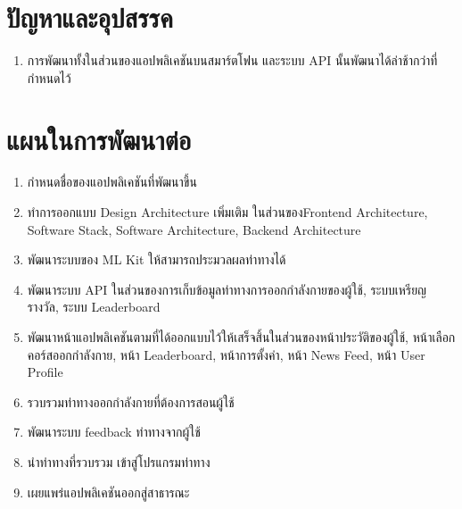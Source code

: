 \section{ปัญหาและอุปสรรค}
\begin{enumerate}
    \item การพัฒนาทั้งในส่วนของแอปพลิเคชันบนสมาร์ตโฟน และระบบ API นั้นพัฒนาได้ล่าช้ากว่าที่กำหนดไว้
\end{enumerate}

\section{แผนในการพัฒนาต่อ}
\begin{enumerate}
    \item กำหนดชื่อของแอปพลิเคชันที่พัฒนาขึ้น
    \item ทำการออกแบบ Design Architecture เพิ่มเติม ในส่วนของFrontend Architecture, Software Stack, Software Architecture, Backend Architecture
    \item พัฒนาระบบของ ML Kit ให้สามารถประมวลผลท่าทางได้
    \item พัฒนาระบบ API ในส่วนของการเก็บข้อมูลท่าทางการออกกำลังกายของผู้ใช้, ระบบเหรียญรางวัล, ระบบ Leaderboard
    \item พัฒนาหน้าแอปพลิเคชันตามที่ได้ออกแบบไว้ให้เสร็จสิ้นในส่วนของหน้าประวัติของผู้ใช้, หน้าเลือกคอร์สออกกำลังกาย, หน้า Leaderboard, หน้าการตั้งค่า, หน้า News Feed, หน้า User Profile
    \item รวบรวมท่าทางออกกำลังกายที่ต้องการสอนผู้ใช้
    \item พัฒนาระบบ feedback ท่าทางจากผู้ใช้
    \item นำท่าทางที่รวบรวม เข้าสู่โปรแกรมท่าทาง
    \item เผยแพร่แอปพลิเคชันออกสู่สาธารณะ

\end{enumerate}


